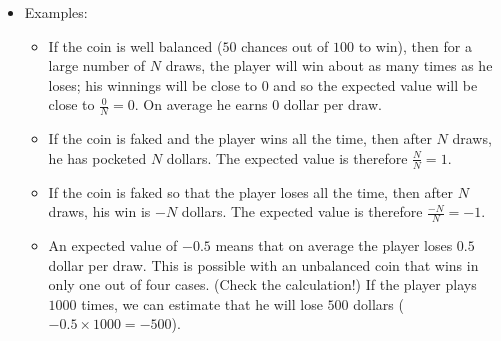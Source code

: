 \documentclass[11pt,class=report,crop=false]{standalone}
\begin{document}
\begin{cours}
\begin{itemize}
  \item Examples:
  \begin{itemize}
    \item If the coin is well balanced ($50$ chances out of $100$ to win),
    then for a large number of $N$ draws, the player will win about as many times as he loses; his winnings will be close to $0$ and so the expected value will be close to $\frac{0}{N} = 0$. On average he earns $0$ dollar per draw.
    
    \item If the coin is faked and the player wins all the time, then after $N$ draws, he has pocketed $N$ dollars. The expected value is therefore $\frac{N}{N}=1$.
    
    \item If the coin is faked so that the player loses all the time, then after $N$ draws, his win is $-N$ dollars. The expected value is therefore $\frac{-N}{N}=-1$.
    
    \item An expected value of $-0.5$ means that on average the player loses $0.5$ dollar per draw. This is possible with an unbalanced coin that wins in only one out of four cases. (Check the calculation!) If the player plays $1000$ times, we can estimate that he will lose $500$ dollars ($-0.5 \times 1000 = -500$).
 \end{itemize}     
\end{itemize}

\end{cours}


\end{document}
